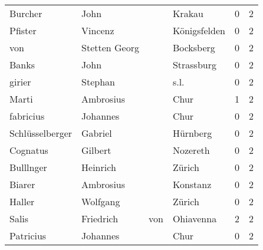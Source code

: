 \documentclass[10pt,a4paper,landscape]{article}
\begin{document}
\begin{longtable}{llllrr}
                  Burcher &                               John &             &                                      Krakau &          0 &         2 \\
                  Pfister &                            Vincenz &             &                                Königsfelden &          0 &         2 \\
                      von &                      Stetten Georg &             &                                   Bocksberg &          0 &         2 \\
                    Banks &                               John &             &                                  Strassburg &          0 &         2 \\
                   girier &                            Stephan &             &                                        s.l. &          0 &         2 \\
                    Marti &                          Ambrosius &             &                                        Chur &          1 &         2 \\
                fabricius &                           Johannes &             &                                        Chur &          0 &         2 \\
          Schlüsselberger &                            Gabriel &             &                                    Hürnberg &          0 &         2 \\
                 Cognatus &                            Gilbert &             &                                    Nozereth &          0 &         2 \\
                Bulllnger &                           Heinrich &             &                                      Zürich &          0 &         2 \\
                   Biarer &                          Ambrosius &             &                                    Konstanz &          0 &         2 \\
                   Haller &                           Wolfgang &             &                                      Zürich &          0 &         2 \\
                    Salis &                          Friedrich &         von &                                   Ohiavenna &          2 &         2 \\
                Patricius &                           Johannes &             &                                        Chur &          0 &         2 \\

\end{longtable}
\end{document}
